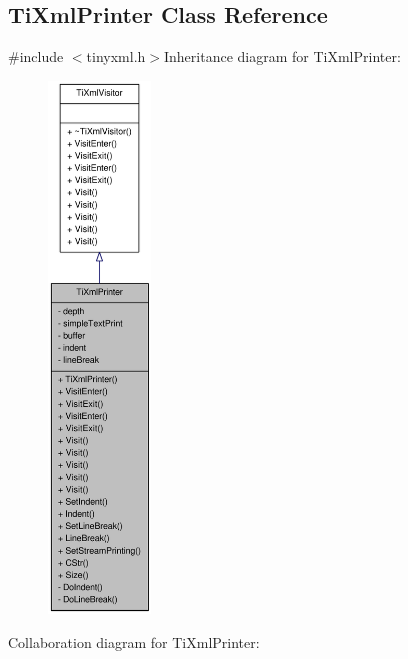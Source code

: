 \hypertarget{class_ti_xml_printer}{
\subsection{TiXmlPrinter Class Reference}
\label{class_ti_xml_printer}
}


{\ttfamily \#include $<$tinyxml.h$>$}Inheritance diagram for TiXmlPrinter:\nopagebreak
\begin{figure}[H]
\begin{center}
\leavevmode
\includegraphics[height=400pt]{class_ti_xml_printer__inherit__graph}
\end{center}
\end{figure}
Collaboration diagram for TiXmlPrinter:\nopagebreak
